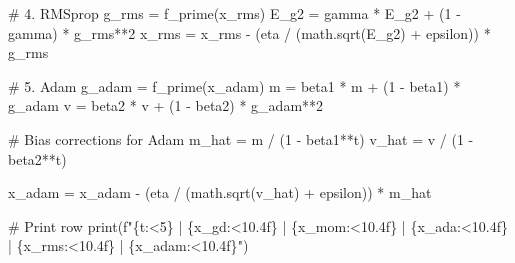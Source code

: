 \documentclass[
  letterpaper,
  DIV=11,
  numbers=noendperiod]{scrreprt}
\newenvironment{Shaded}{\begin{snugshade}}{\end{snugshade}}
\newcommand{\BuiltInTok}[1]{\textcolor[rgb]{0.00,0.23,0.31}{#1}}
\newcommand{\CommentTok}[1]{\textcolor[rgb]{0.37,0.37,0.37}{#1}}
\newcommand{\DecValTok}[1]{\textcolor[rgb]{0.68,0.00,0.00}{#1}}
\newcommand{\NormalTok}[1]{\textcolor[rgb]{0.00,0.23,0.31}{#1}}
\newcommand{\OperatorTok}[1]{\textcolor[rgb]{0.37,0.37,0.37}{#1}}
\newcommand{\SpecialCharTok}[1]{\textcolor[rgb]{0.37,0.37,0.37}{#1}}
\newcommand{\SpecialStringTok}[1]{\textcolor[rgb]{0.13,0.47,0.30}{#1}}
\begin{document}
\begin{Shaded}
\begin{Highlighting}[]
    \CommentTok{\# 4. RMSprop}
\NormalTok{    g\_rms }\OperatorTok{=}\NormalTok{ f\_prime(x\_rms)}
\NormalTok{    E\_g2 }\OperatorTok{=}\NormalTok{ gamma }\OperatorTok{*}\NormalTok{ E\_g2 }\OperatorTok{+}\NormalTok{ (}\DecValTok{1} \OperatorTok{{-}}\NormalTok{ gamma) }\OperatorTok{*}\NormalTok{ g\_rms}\OperatorTok{**}\DecValTok{2}
\NormalTok{    x\_rms }\OperatorTok{=}\NormalTok{ x\_rms }\OperatorTok{{-}}\NormalTok{ (eta }\OperatorTok{/}\NormalTok{ (math.sqrt(E\_g2) }\OperatorTok{+}\NormalTok{ epsilon)) }\OperatorTok{*}\NormalTok{ g\_rms}
    
    \CommentTok{\# 5. Adam}
\NormalTok{    g\_adam }\OperatorTok{=}\NormalTok{ f\_prime(x\_adam)}
\NormalTok{    m }\OperatorTok{=}\NormalTok{ beta1 }\OperatorTok{*}\NormalTok{ m }\OperatorTok{+}\NormalTok{ (}\DecValTok{1} \OperatorTok{{-}}\NormalTok{ beta1) }\OperatorTok{*}\NormalTok{ g\_adam}
\NormalTok{    v }\OperatorTok{=}\NormalTok{ beta2 }\OperatorTok{*}\NormalTok{ v }\OperatorTok{+}\NormalTok{ (}\DecValTok{1} \OperatorTok{{-}}\NormalTok{ beta2) }\OperatorTok{*}\NormalTok{ g\_adam}\OperatorTok{**}\DecValTok{2}
    
    \CommentTok{\# Bias corrections for Adam}
\NormalTok{    m\_hat }\OperatorTok{=}\NormalTok{ m }\OperatorTok{/}\NormalTok{ (}\DecValTok{1} \OperatorTok{{-}}\NormalTok{ beta1}\OperatorTok{**}\NormalTok{t)}
\NormalTok{    v\_hat }\OperatorTok{=}\NormalTok{ v }\OperatorTok{/}\NormalTok{ (}\DecValTok{1} \OperatorTok{{-}}\NormalTok{ beta2}\OperatorTok{**}\NormalTok{t)}
    
\NormalTok{    x\_adam }\OperatorTok{=}\NormalTok{ x\_adam }\OperatorTok{{-}}\NormalTok{ (eta }\OperatorTok{/}\NormalTok{ (math.sqrt(v\_hat) }\OperatorTok{+}\NormalTok{ epsilon)) }\OperatorTok{*}\NormalTok{ m\_hat}
    
    \CommentTok{\# Print row}
    \BuiltInTok{print}\NormalTok{(}\SpecialStringTok{f"}\SpecialCharTok{\{}\NormalTok{t}\SpecialCharTok{:\textless{}5\}}\SpecialStringTok{ | }\SpecialCharTok{\{}\NormalTok{x\_gd}\SpecialCharTok{:\textless{}10.4f\}}\SpecialStringTok{ | }\SpecialCharTok{\{}\NormalTok{x\_mom}\SpecialCharTok{:\textless{}10.4f\}}\SpecialStringTok{ | }\SpecialCharTok{\{}\NormalTok{x\_ada}\SpecialCharTok{:\textless{}10.4f\}}\SpecialStringTok{ | }\SpecialCharTok{\{}\NormalTok{x\_rms}\SpecialCharTok{:\textless{}10.4f\}}\SpecialStringTok{ | }\SpecialCharTok{\{}\NormalTok{x\_adam}\SpecialCharTok{:\textless{}10.4f\}}\SpecialStringTok{"}\NormalTok{)}
\end{Highlighting}
\end{Shaded}
\end{document}
